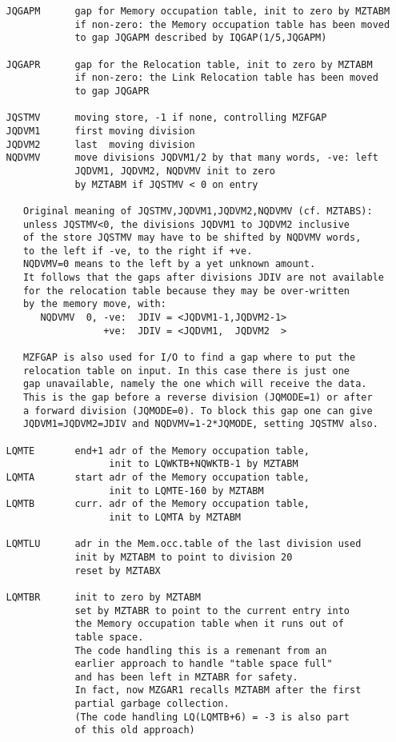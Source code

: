 \begin{verbatim}
   JQGAPM      gap for Memory occupation table, init to zero by MZTABM
               if non-zero: the Memory occupation table has been moved
               to gap JQGAPM described by IQGAP(1/5,JQGAPM)

   JQGAPR      gap for the Relocation table, init to zero by MZTABM
               if non-zero: the Link Relocation table has been moved
               to gap JQGAPR

   JQSTMV      moving store, -1 if none, controlling MZFGAP
   JQDVM1      first moving division
   JQDVM2      last  moving division
   NQDVMV      move divisions JQDVM1/2 by that many words, -ve: left
               JQDVM1, JQDVM2, NQDVMV init to zero
               by MZTABM if JQSTMV < 0 on entry

      Original meaning of JQSTMV,JQDVM1,JQDVM2,NQDVMV (cf. MZTABS):
      unless JQSTMV<0, the divisions JQDVM1 to JQDVM2 inclusive
      of the store JQSTMV may have to be shifted by NQDVMV words,
      to the left if -ve, to the right if +ve.
      NQDVMV=0 means to the left by a yet unknown amount.
      It follows that the gaps after divisions JDIV are not available
      for the relocation table because they may be over-written
      by the memory move, with:
         NQDVMV  0, -ve:  JDIV = <JQDVM1-1,JQDVM2-1>
                    +ve:  JDIV = <JQDVM1,  JQDVM2  >

      MZFGAP is also used for I/O to find a gap where to put the
      relocation table on input. In this case there is just one
      gap unavailable, namely the one which will receive the data.
      This is the gap before a reverse division (JQMODE=1) or after
      a forward division (JQMODE=0). To block this gap one can give
      JQDVM1=JQDVM2=JDIV and NQDVMV=1-2*JQMODE, setting JQSTMV also.

   LQMTE       end+1 adr of the Memory occupation table,
                     init to LQWKTB+NQWKTB-1 by MZTABM
   LQMTA       start adr of the Memory occupation table,
                     init to LQMTE-160 by MZTABM
   LQMTB       curr. adr of the Memory occupation table,
                     init to LQMTA by MZTABM

   LQMTLU      adr in the Mem.occ.table of the last division used
               init by MZTABM to point to division 20
               reset by MZTABX

   LQMTBR      init to zero by MZTABM
               set by MZTABR to point to the current entry into
               the Memory occupation table when it runs out of
               table space.
               The code handling this is a remenant from an
               earlier approach to handle "table space full"
               and has been left in MZTABR for safety.
               In fact, now MZGAR1 recalls MZTABM after the first
               partial garbage collection.
               (The code handling LQ(LQMTB+6) = -3 is also part
               of this old approach)


\end{verbatim}
